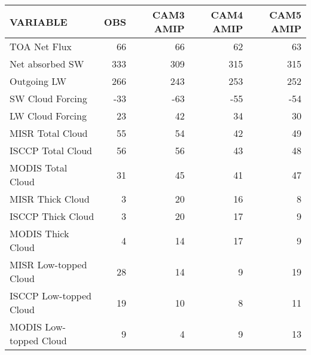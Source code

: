 \begin{tabular}{lrrrr}
\hline
                VARIABLE &                      OBS &                CAM3 AMIP &                CAM4 AMIP &                CAM5 AMIP \\ \hline
            TOA Net Flux &                       66 &                       66 &                       62 &                       63 \\
         Net absorbed SW &                      333 &                      309 &                      315 &                      315 \\
             Outgoing LW &                      266 &                      243 &                      253 &                      252 \\
        SW Cloud Forcing &                      -33 &                      -63 &                      -55 &                      -54 \\
        LW Cloud Forcing &                       23 &                       42 &                       34 &                       30 \\
        MISR Total Cloud &                       55 &                       54 &                       42 &                       49 \\
       ISCCP Total Cloud &                       56 &                       56 &                       43 &                       48 \\
       MODIS Total Cloud &                       31 &                       45 &                       41 &                       47 \\
        MISR Thick Cloud &                        3 &                       20 &                       16 &                        8 \\
       ISCCP Thick Cloud &                        3 &                       20 &                       17 &                        9 \\
       MODIS Thick Cloud &                        4 &                       14 &                       17 &                        9 \\
   MISR Low-topped Cloud &                       28 &                       14 &                        9 &                       19 \\
  ISCCP Low-topped Cloud &                       19 &                       10 &                        8 &                       11 \\
  MODIS Low-topped Cloud &                        9 &                        4 &                        9 &                       13 \\

\end{tabular}
